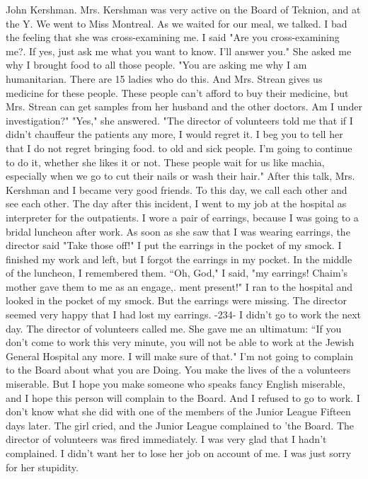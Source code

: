 John Kershman. Mrs. Kershman was very active on the Board of Teknion, and at 
the Y. 
We went to Miss Montreal. As we waited for our meal, we talked. I bad the 
feeling that she was cross-examining me. I said "Are you cross-examining me?. If 
yes, just ask me what you want to know. I'll answer you." 
She asked me why I brought food to all those people. 
"You are asking me why I am humanitarian. There are 15 ladies who do this. 
And Mrs. Strean gives us medicine for these people. These people can't afford to 
buy their medicine, but Mrs. Strean can get samples from her husband and the other 
doctors. Am I under investigation?" 
"Yes," she answered. 
"The director of volunteers told me that if I didn't chauffeur the patients any 
more, I would regret it. I beg you to tell her that I do not regret bringing food. 
to old and sick people. I'm going to continue to do it, whether she likes it or 
not. These people wait for us like machia, especially when we go to cut their nails 
or wash their hair." 
After this talk, Mrs. Kershman and I became very good friends. To this day, we 
call each other and see each other. The day after this incident, I went to my job at 
the hospital as interpreter for the outpatients. I wore a pair of earrings, because I 
was going to a bridal luncheon after work. As soon as she saw that I was wearing 
earrings, the director said "Take those off!" I put the earrings in the pocket of 
my smock. I finished my work and left, but I forgot the earrings in my pocket. 
In the middle of the luncheon, I remembered them.
“Oh, God," I said, "my earrings! Chaim’s mother gave them to me as an engage,. 
ment present!" I ran to the hospital and looked in the pocket of my smock. But the 
earrings were missing. The director seemed very happy that I had lost my earrings.
-234-
I didn't go to work the next day. The director of volunteers 
called me. She gave me an ultimatum: “If you don't come to work this 
very minute, you will not be able to work at the Jewish General Hospital any more. I will make sure of that." 
I'm not going to complain to the Board about what you are
Doing. You make the lives of the a volunteers miserable. But I hope you make someone
who speaks fancy English miserable, and I hope 
this person will complain to the Board. And I refused to go to work.
I don’t know what she did with one of the members of the Junior League
Fifteen days later. The girl cried, and the Junior League complained to 'the Board. The director of volunteers was fired immediately.
I was very glad that I hadn't complained. I didn't want her to lose her 
job on account of me. I was just sorry for her stupidity. 


